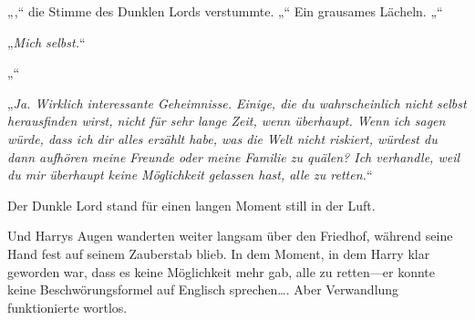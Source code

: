 „,“ die Stimme des Dunklen Lords verstummte.
„“
Ein grausames Lächeln.
„“

„\emph{Mich selbst.}“

„“

„\emph{Ja. Wirklich interessante Geheimnisse. Einige, die du wahrscheinlich nicht selbst herausfinden wirst, nicht für sehr lange Zeit, wenn überhaupt. Wenn ich sagen würde, dass ich dir alles erzählt habe, was die Welt nicht riskiert, würdest du dann aufhören meine Freunde oder meine Familie zu quälen? Ich verhandle, weil du mir überhaupt keine Möglichkeit gelassen hast, alle zu retten.}“

Der Dunkle Lord stand für einen langen Moment still in der Luft.

Und Harrys Augen wanderten weiter langsam über den Friedhof, während seine Hand fest auf seinem Zauberstab blieb. In dem Moment, in dem Harry klar geworden war, dass es keine Möglichkeit mehr gab, alle zu retten—er konnte keine Beschwörungsformel auf Englisch sprechen….
Aber Verwandlung funktionierte wortlos.

